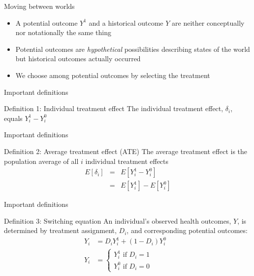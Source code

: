 \documentclass{beamer}
\begin{document}
\begin{frame}{Moving between worlds}

\begin{itemize}
\item A potential outcome $Y^1$ and a historical outcome $Y$ are neither conceptually nor notationally the same thing
\item Potential outcomes are \emph{hypothetical} possibilities describing states of the world but historical outcomes actually occurred
\item We choose among potential outcomes by selecting the treatment
\end{itemize}
\end{frame}



\begin{frame}{Important definitions}
	\begin{block}{Definition 1: Individual treatment effect}
	    The individual treatment effect,  $\delta_i$, equals $Y_i^1-Y_i^0$
	\end{block}
\end{frame}

\begin{frame}{Important definitions}
	\begin{block}{Definition 2: Average treatment effect (ATE)}
        The average treatment effect is the population average of all $i$ individual treatment effects 
        \begin{eqnarray*}
        E[\delta_i]&=&E[Y_i^1-Y_i^0]\\
        &=&E[Y^1_i] - E[Y^0_i]
        \end{eqnarray*}
	\end{block}
\end{frame}

\begin{frame}{Important definitions}
	\begin{block}{Definition 3: Switching equation}
	    An individual's observed health outcomes, $Y$, is determined by treatment assignment, $D_i$, and corresponding potential outcomes:
		      \begin{eqnarray*}
	      Y_i& = D_iY^1_i+(1-D_i)Y^0_i& \\
	      Y_i& = \begin{cases}
	      		Y^1_i\text{ if }D_i=1 \\
			Y^0_i\text{ if }D_i=0
			\end{cases}
	    		\end{eqnarray*}
	\end{block}
\end{frame}
\end{document}
